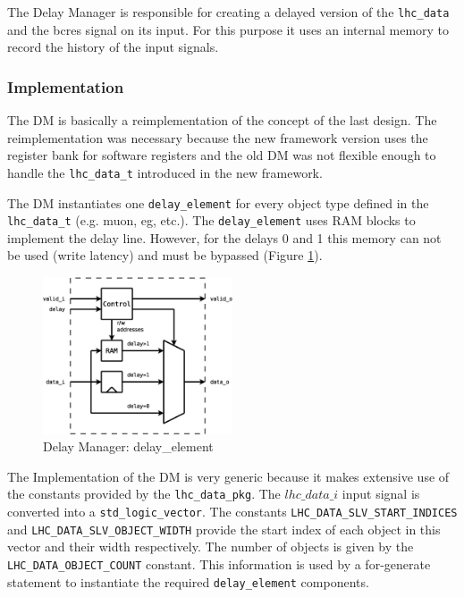 The Delay Manager is responsible for creating a delayed version of the \texttt{lhc\_data} and the bcres signal on its input. 
For this purpose it uses an internal memory to record the history of the input signals.

\subsubsection{Implementation}\label{sec:dm-impl}
The DM is basically a reimplementation of the concept of the last design. The reimplementation was necessary because the new framework version uses the register bank for 
software registers and the old DM was not flexible enough to handle the \texttt{lhc\_data\_t} introduced in the new framework.

The DM instantiates one \texttt{delay\_element} for every object type defined in the \texttt{lhc\_data\_t} (e.g. muon, eg, etc.). The \texttt{delay\_element} uses RAM blocks 
to implement the delay line. However, for the delays 0 and 1 this memory can not be used (write latency) and must be bypassed (Figure \ref{fig_dm_delay_element}).

\begin{figure}[h]
\begin{center}
\includegraphics[width=0.5\textwidth]{./figures/dm_delay_element}
\end{center}
\caption{Delay Manager: delay\_element}
\label{fig_dm_delay_element}
\end{figure}

The Implementation of the DM is very generic because it makes extensive use of the constants provided by the \texttt{lhc\_data\_pkg}. The $lhc\_data\_i$ input signal 
is converted into a \texttt{std\_logic\_vector}.
The constants \texttt{LHC\_DATA\_SLV\_START\_INDICES} and \texttt{LHC\_DATA\_SLV\_OBJECT\_WIDTH} provide the start index of each object in this vector and their 
width respectively. The number of objects is given by the \texttt{LHC\_DATA\_OBJECT\_COUNT} constant. This information is used by a for-generate statement to instantiate 
the required \texttt{delay\_element} components.


